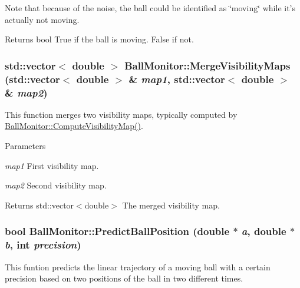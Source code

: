 Note that because of the noise, the ball could be identified as \char`\"{}moving\char`\"{} while it's actually not moving. \begin{DoxyReturn}{Returns}
bool True if the ball is moving. False if not. 
\end{DoxyReturn}
\hypertarget{classBallMonitor_a74f8a1ce881528e475269fa1c964fa61}{
\subsubsection[{MergeVisibilityMaps}]{\setlength{\rightskip}{0pt plus 5cm}std::vector$<$ double $>$ BallMonitor::MergeVisibilityMaps (std::vector$<$ double $>$ \& {\em map1}, \/  std::vector$<$ double $>$ \& {\em map2})}}
\label{classBallMonitor_a74f8a1ce881528e475269fa1c964fa61}


This function merges two visibility maps, typically computed by \hyperlink{classBallMonitor_a0d2ef73ba2b0573021c800c311e08245}{BallMonitor::ComputeVisibilityMap()}. 


\begin{DoxyParams}{Parameters}
\item[{\em map1}]First visibility map. \item[{\em map2}]Second visibility map. \end{DoxyParams}
\begin{DoxyReturn}{Returns}
std::vector$<$double$>$ The merged visibility map. 
\end{DoxyReturn}
\hypertarget{classBallMonitor_a914053314023ea79ee691a3031e355bf}{
\subsubsection[{PredictBallPosition}]{\setlength{\rightskip}{0pt plus 5cm}bool BallMonitor::PredictBallPosition (double $\ast$ {\em a}, \/  double $\ast$ {\em b}, \/  int {\em precision})}}
\label{classBallMonitor_a914053314023ea79ee691a3031e355bf}


This funtion predicts the linear trajectory of a moving ball with a certain precision based on two positions of the ball in two different times. 


